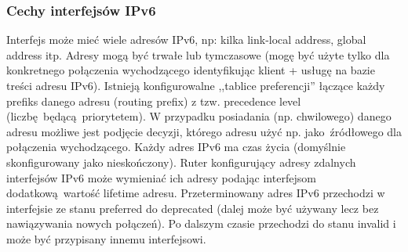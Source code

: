 \documentclass[a4paper, 12pt, titlepage]{article}
\begin{document}
			\subsubsection{Cechy interfejsów IPv6}
				Interfejs może mieć wiele adresów IPv6, np: kilka link-local address, global address itp. Adresy mogą być trwałe lub tymczasowe (mogę być użyte tylko dla konkretnego połączenia wychodzącego identyfikując klient + usługę na bazie treści adresu IPv6). \newline \newline 
				Istnieją konfigurowalne ,,tablice preferencji'' łączące każdy prefiks danego adresu (routing prefix) z tzw. precedence level (liczbę będącą priorytetem). W przypadku posiadania (np. chwilowego) danego adresu możliwe jest podjęcie decyzji, którego adresu użyć np. jako źródłowego dla połączenia wychodzącego.
				\newline \newline
				Każdy adres IPv6 ma czas życia (domyślnie skonfigurowany jako nieskończony). Ruter konfigurujący adresy zdalnych interfejsów IPv6 może wymieniać ich adresy podając interfejsom dodatkową wartość lifetime adresu. Przeterminowany adres IPv6 przechodzi w interfejsie ze stanu preferred do deprecated (dalej może być używany lecz bez nawiązywania nowych połączeń). Po dalszym czasie przechodzi do stanu invalid i może być przypisany innemu interfejsowi.
\end{document}

